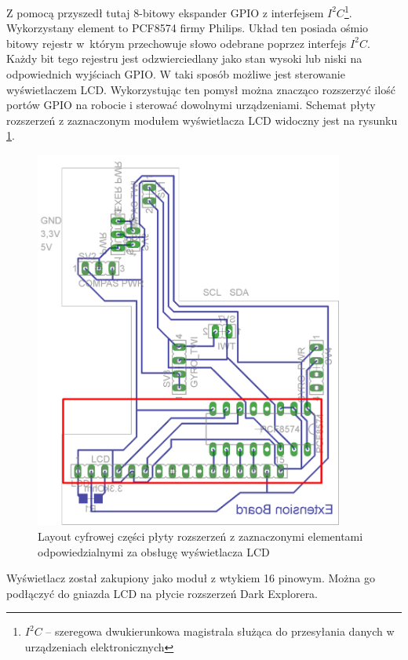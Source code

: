 Z pomocą przyszedł tutaj 8-bitowy ekspander GPIO z interfejsem
$I^{2}C$\footnote{$I^{2}C$ -- szeregowa dwukierunkowa magistrala służąca do
przesyłania danych w urządzeniach elektronicznych}. Wykorzystany element to
PCF8574 firmy Philips. Układ ten posiada ośmio bitowy rejestr w~którym
przechowuje słowo odebrane poprzez interfejs $I^{2}C$. Każdy bit tego rejestru
jest odzwierciedlany jako stan wysoki lub niski na odpowiednich wyjściach GPIO. W
taki sposób możliwe jest sterowanie wyświetlaczem LCD. Wykorzystując ten pomysł
można znacząco rozszerzyć ilość portów GPIO na robocie i sterować dowolnymi
urządzeniami. Schemat płyty rozszerzeń z zaznaczonym modułem wyświetlacza LCD
widoczny jest na rysunku \ref{fig:ExBoardWithLCD}.

\begin{figure}[!ht]
 \centering
 \includegraphics[height=125mm]{../images/ch04/extension_board-LCD.png}
 \caption{Layout cyfrowej części płyty rozszerzeń z zaznaczonymi elementami odpowiedzialnymi za obsługę wyświetlacza LCD}
 \label{fig:ExBoardWithLCD}
\end{figure}

Wyświetlacz został zakupiony jako moduł z wtykiem 16 pinowym. Można go podłączyć
do gniazda LCD na płycie rozszerzeń Dark Explorera.
